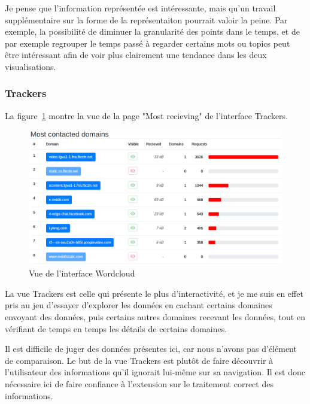		Je pense que l'information représentée est intéressante, mais qu'un travail supplémentaire sur la forme de la représentaiton pourrait valoir la peine. Par exemple, la possibilité de diminuer la granularité des points dans le temps, et de par exemple regrouper le temps passé à regarder certains mots ou topics peut être intéressant afin de voir plus clairement une tendance dans les deux visualisations.

\FloatBarrier

		\subsubsection{Trackers}

		La figure~\ref{critique-trackers} montre la vue de la page "Most recieving" de l'interface Trackers.

		\begin{figure}[!h]
			\centering
			\includegraphics[width=1\textwidth]{images/results/critique-trackers}
			\caption{Vue de l'interface Wordcloud}
			\label{critique-trackers}
		\end{figure}

		La vue Trackers est celle qui présente le plus d'interactivité, et je me suis en effet pris au jeu d'essayer d'explorer les données en cachant certains domaines envoyant des données, puis certains autres domaines recevant les données, tout en vérifiant de temps en temps les détails de certains domaines.

		Il est difficile de juger des données présentes ici, car nous n'avons pas d'élément de comparaison. Le but de la vue Trackers est plutôt de faire découvrir  à l'utilisateur des informations qu'il ignorait lui-même sur sa navigation. Il est donc nécessaire ici de faire confiance à l'extension sur le traitement correct des informations.


